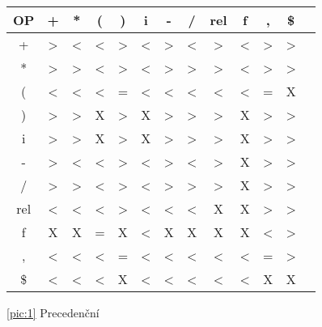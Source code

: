 \documentclass[11pt, a4paper]{article}
\begin{document}
\renewcommand{\arraystretch}{2}
\scriptsize
\centering
\begin{tabular}{ c | c c c c c c c c c c c c } 
OP  & + & * & ( & ) & i & - & / & rel & f & , & \$ \\ \hline
+ & \textgreater & \textless & \textless &  \textgreater & \textless & \textgreater & \textless 
  & \textgreater & \textless  &  \textgreater &  \textgreater   \\ \hline
* & \textgreater & \textgreater & \textless & \textgreater & \textless & \textgreater   
  & \textgreater  & \textgreater  & \textless & \textgreater & \textgreater \\ \hline
( & \textless & \textless & \textless & = & \textless & \textless & \textless & \textless 
   & \textless & = & X \\ \hline
) & \textgreater & \textgreater & X & \textgreater & X & \textgreater & \textgreater 
  & \textgreater  & X & \textgreater & \textgreater \\ \hline
i & \textgreater & \textgreater & X & \textgreater & X & \textgreater & \textgreater 
  & \textgreater & X & \textgreater & \textgreater \\ \hline
- & \textgreater & \textless & \textless & \textgreater & \textless & \textgreater & \textless 
  & \textgreater & X & \textgreater & \textgreater \\ \hline
/ & \textgreater & \textgreater & \textless &  \textgreater & \textless & \textgreater 
  & \textgreater & \textgreater & X & \textgreater & \textgreater \\ \hline
rel & \textless & \textless & \textless & \textgreater & \textless & \textless & \textless 
    & X & X & \textgreater & \textgreater \\ \hline
f   & X & X & = & X & \textless & X & X & X & X & \textless  & \textgreater \\ \hline
, & \textless & \textless & \textless & = & \textless & \textless & \textless & \textless 
  & \textless & = & \textgreater \\ \hline
\$ & \textless & \textless & \textless & X & \textless & \textless & \textless & \textless 
   & \textless & X & X 
\label{pic:1}
\end{tabular}
\renewcommand{\arraystretch}{1}

\ref{pic:1} Precedenční
\end{document}
